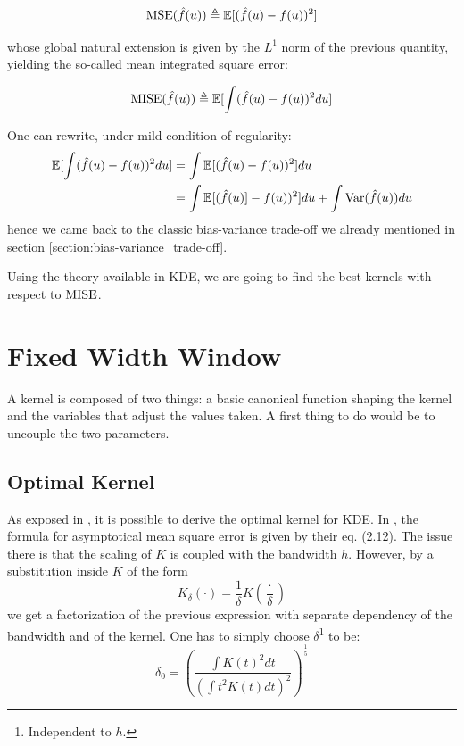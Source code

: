 \documentclass[11pt]{book}
\begin{document}
\begin{equation}
\operatorname{MSE} ( \hat{f}(u) ) \triangleq  \mathbb E [ ( \hat{f}(u) - f(u) )^2 ]
\end{equation}

whose global natural extension is given by the $L^1$ norm of the previous quantity, yielding the so-called mean integrated square error:

\begin{equation}
\operatorname{MISE} ( \hat{f}(u) ) \triangleq  \mathbb E [ \int ( \hat{f}(u) - f(u) )^2 du ]
\end{equation}

\begin{remarque}
One can rewrite, under mild condition of regularity:
\begin{align*}
\mathbb E [ \int ( \hat{f}(u) - f(u) )^2 du ] &= \int \mathbb E [( \hat{f}(u) - f(u) )^2 ] du \\
&= \int  \mathbb E[ (\hat{f}(u) ] - f(u) )^2 ] du + \int \mathrm{Var}( \hat{f}(u)) du 
\end{align*}
hence we came back to the classic bias-variance trade-off we already mentioned in section \ref{section:bias-variance_trade-off}.
\end{remarque}

Using the theory available in KDE, we are going to find the best kernels with respect to $\operatorname{MISE}$.

\section{Fixed Width Window}
\label{section:FWW}

A kernel is composed of two things: a basic canonical function shaping the kernel and the variables that adjust the values taken. A first thing to do would be to uncouple the two parameters.

\subsection{Optimal Kernel}

As exposed in \cite{Wand}, it is possible to derive the optimal kernel for KDE. In \cite{Wand}, the formula for asymptotical mean square error is given by their eq. (2.12). The issue there is that the scaling of $K$ is coupled with the bandwidth $h$. However, by a substitution inside $K$ of the form 
$$ K_{\delta} ( \cdot ) = \frac 1  {\delta } K \left ( \frac {\cdot } { \delta } \right ) $$
we get a factorization of the previous expression with separate dependency of the bandwidth and of the kernel. One has to simply choose $\delta$\footnote{Independent to $h$.} to be: $$ \delta_0 = \left ( \frac{ \int K(t)^2 dt }{ \left ( \int t^2 K(t) dt \right )^2 } \right ) ^{\frac 1 5} $$
\end{document}
